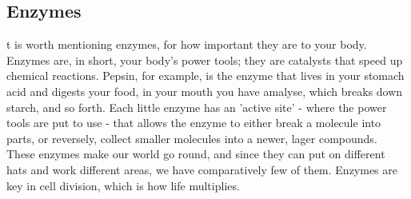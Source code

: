 \subsection{Enzymes}
t is worth mentioning enzymes, for how important they are to your body. Enzymes are, in short, your body's power tools; they are catalysts that speed up chemical reactions. Pepsin, for example, is the enzyme that lives in your stomach acid and digests your food, in your mouth you have amalyse, which breaks down starch, and so forth. Each little enzyme has an 'active site' - where the power tools are put to use - that allows the enzyme to either break a molecule into parts, or reversely, collect smaller molecules into a newer, lager compounds. These enzymes make our world go round, and since they can put on different hats and work different areas, we have comparatively few of them. Enzymes are key in cell division, which is how life multiplies. 

